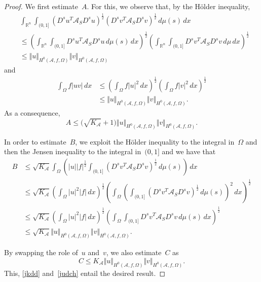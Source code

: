 \documentclass[11pt,hyp,]{nyjm}
\numberwithin{equation}{section}
\newcommand{\R}{\mathbb{R}}
\theoremstyle{remark}
\newcommand{\am}{\mathcal{A}}
\renewcommand{\leq}{\leqslant}
\begin{document}
\begin{proof}
We first estimate~$A$. For this, we observe that, by the H\"{o}lder inequality,
\begin{align*}&
\int_{\R^n} \int_{(0,1]} (D^su^T \mathcal{A}_S D^su)^{\frac{1}{2}} (D^sv^T \mathcal{A}_S D^sv)^{\frac{1}{2}} \, d\mu(s) \, dx  \\ &\leq \left( \int_{\R^n} \int_{(0,1]} D^su^T \mathcal{A}_S D^su  \, d\mu(s) \, dx \right)^{\frac{1}{2}}  \left( \int_{\R^n} \int_{(0,1]} D^sv^T \mathcal{A}_S D^sv  \, d\mu \, dx \right)^{\frac{1}{2}}
\\ &\leq \Vert u \Vert_{H^0(\mathcal{A}, f, \Omega)} \Vert v \Vert_{H^0(\mathcal{A}, f, \Omega)}
\end{align*}
and
\begin{equation*}\begin{split}
\int_{\Omega}f |u v| \, dx &\leq  \left( \int_{\Omega} f |u|^2  \, dx \right)^{\frac{1}{2}} \left( \int_{\Omega} f |v|^2  \, dx \right)^{\frac{1}{2}} \\&\leq \Vert u \Vert_{H^0(\mathcal{A}, f, \Omega)} \Vert v \Vert_{H^0(\mathcal{A}, f, \Omega)} .\end{split}
\end{equation*}
As a consequence, 
\begin{equation}\label{jkdd}
A \leq \big(\sqrt{K_{\mathcal{A}}}+1\big) \Vert u \Vert_{H^0(\mathcal{A}, f, \Omega)} \Vert v \Vert_{H^0(\mathcal{A}, f, \Omega)}.
\end{equation}

In order to estimate~$B$, we exploit the H\"older inequality to the integral in~$\Omega$ and then the Jensen inequality to the integral in~$(0,1]$ and we have that
\begin{equation}\begin{split} \label{judch}
B &\leq \sqrt{K_{\am}} \int_{\Omega} \left(
|u| |f|^{\frac{1}{2}}  \int_{(0,1]} (D^sv^T \mathcal{A}_S D^sv)^{\frac{1}{2}} \, d\mu(s) \right) \, dx  \\ &\leq \sqrt{K_{\am}} \left(\int_{\Omega} |u|^2 |f| \, dx\right)^{\frac{1}{2}}\left(\int_{\Omega}\left( \int_{(0,1]}(D^sv^T \mathcal{A}_S D^sv )^{\frac12} \, d\mu(s)\right)^2 \, dx \right)^{\frac{1}{2}}\\ &\leq \sqrt{K_{\am}} \left(\int_{\Omega} |u|^2 |f| \, dx\right)^{\frac{1}{2}}\left(\int_{\Omega} \int_{(0,1]}D^sv^T \mathcal{A}_S D^sv  \, d\mu (s)\, dx \right)^{\frac{1}{2}}
\\ & \leq \sqrt{K_{\am}} \Vert u \Vert_{H^0(\mathcal{A}, f, \Omega)} \Vert v \Vert_{H^0(\mathcal{A}, f, \Omega)}.
\end{split}\end{equation}

By swapping the role of~$u$ and~$v$, we also estimate~$C$ as
\begin{equation*}
C \leq K_{\am} \Vert u \Vert_{H^0(\mathcal{A}, f, \Omega)} \Vert v \Vert_{H^0(\mathcal{A}, f, \Omega)}.
\end{equation*}
This, \eqref{jkdd} and~\eqref{judch} entail the desired result. 
			\end{proof}
			
\end{document}
